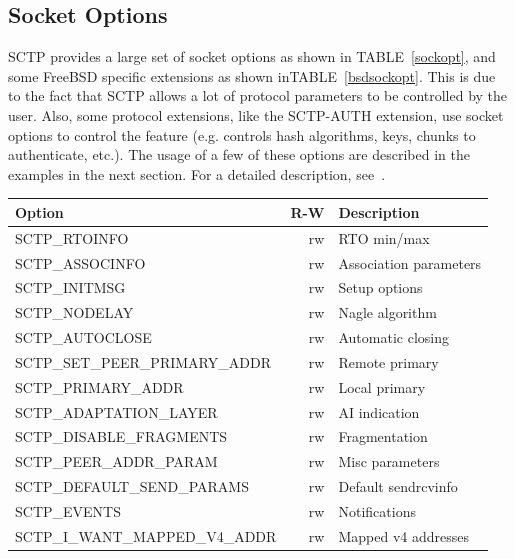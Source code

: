 \documentclass[conference]{IEEEtran}
\begin{document}
\subsection{Socket Options}

SCTP provides a large set of socket options as shown in TABLE~\ref{sockopt}, and some FreeBSD
specific extensions as shown inTABLE~\ref{bsdsockopt}.
This is due to the fact that SCTP allows a lot of protocol parameters to be controlled by the
user. Also, some protocol extensions, like the SCTP-AUTH \cite{rfc4895} extension, use socket options to
control the feature (e.g. controls hash algorithms, keys, chunks to authenticate, etc.). 
The usage of a few of these options are described in the examples in the
next section. For a detailed description, see~\cite{socketdraft}.

\begin{table}[h]
\begin{center}
\begin{tabular}{|l|r|l|}
\hline
Option                          & R-W & Description              \\\hline
\hline
SCTP\_RTOINFO                   & rw  & RTO min/max              \\\hline
SCTP\_ASSOCINFO                 & rw  & Association parameters   \\\hline
SCTP\_INITMSG                   & rw  & Setup options            \\\hline
SCTP\_NODELAY                   & rw  & Nagle algorithm          \\\hline
SCTP\_AUTOCLOSE                 & rw  & Automatic closing        \\\hline
SCTP\_SET\_PEER\_PRIMARY\_ADDR  & rw  & Remote primary           \\\hline
SCTP\_PRIMARY\_ADDR             & rw  & Local primary            \\\hline
SCTP\_ADAPTATION\_LAYER         & rw  & AI indication            \\\hline
SCTP\_DISABLE\_FRAGMENTS        & rw  & Fragmentation            \\\hline
SCTP\_PEER\_ADDR\_PARAM         & rw  & Misc parameters          \\\hline
SCTP\_DEFAULT\_SEND\_PARAMS     & rw  & Default sendrcvinfo      \\\hline
SCTP\_EVENTS                    & rw  & Notifications            \\\hline
SCTP\_I\_WANT\_MAPPED\_V4\_ADDR & rw  & Mapped v4 addresses      \\\hline

\end{tabular}
\end{center}
\end{table}
\end{document}
